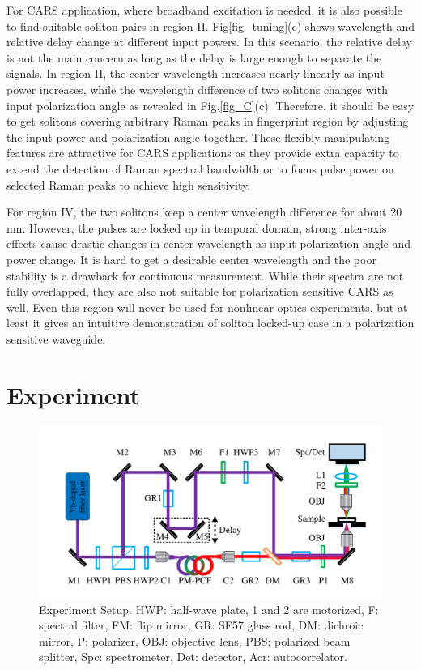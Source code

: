 \documentclass{osa-article}
\begin{document}
For CARS application, where broadband excitation is needed, it is also possible to find suitable soliton pairs in region II. Fig\ref{fig_tuning}(c) shows wavelength and relative delay change at different input powers. In this scenario, the relative delay is not the main concern as long as the delay is large enough to separate the signals. In region II, the center wavelength increases nearly linearly as input power increases, while the wavelength difference of two solitons changes with input polarization angle as revealed in Fig.\ref{fig_C}(c). Therefore, it should be easy to get solitons covering arbitrary Raman peaks in fingerprint region by adjusting the input power and polarization angle together. These flexibly manipulating features are attractive for CARS applications as they provide extra capacity to extend the detection of Raman spectral bandwidth or to focus pulse power on selected Raman peaks to achieve high sensitivity.

For region IV, the two solitons keep a center wavelength difference for about 20 nm. However, the pulses are locked up in temporal domain, strong inter-axis effects cause drastic changes in center wavelength as input polarization angle and power change. It is hard to get a desirable center wavelength and the poor stability is a drawback for continuous measurement. While their spectra are not fully overlapped, they are also not suitable for polarization sensitive CARS as well\cite{Hofer2017}. Even this region will never be used for nonlinear optics experiments, but at least it gives an intuitive demonstration of soliton locked-up case in a polarization sensitive waveguide.   

\section{Experiment}


\begin{figure}[htbp]
    \centering%
    \includegraphics[width=350pt]{fig_sys.pdf}
    \caption{Experiment Setup. HWP: half-wave plate, 1 and 2 are motorized, F: spectral filter, FM: flip mirror, GR: SF57 glass rod, DM: dichroic mirror, P: polarizer, OBJ: objective lens, PBS: polarized beam splitter, Spc: spectrometer, Det: detector, Acr: autocorrelator.}
    \label{fig_EC}\vspace*{-6pt}
\end{figure}
\end{document}
